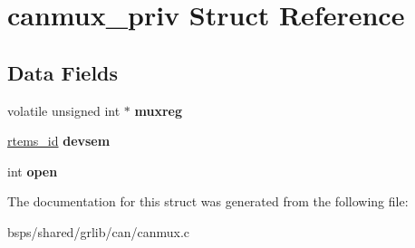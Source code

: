 \hypertarget{structcanmux__priv}{}\section{canmux\+\_\+priv Struct Reference}
\label{structcanmux__priv}
\subsection*{Data Fields}
\begin{DoxyCompactItemize}
\item 
\mbox{\label{structcanmux__priv_aa8e87192fa4ab4be10a4045beac86cce}} 
volatile unsigned int $\ast$ {\bfseries muxreg}
\item 
\mbox{\label{structcanmux__priv_ae428dd2e0b4c8d14272a85972748fe80}} 
\mbox{\hyperlink{group__ClassicTasks_gab20892b814dced7dd4e5b9bf42becd57}{rtems\+\_\+id}} {\bfseries devsem}
\item 
\mbox{\label{structcanmux__priv_aa5d22d97cb24eac09e49e99a39513dc7}} 
int {\bfseries open}
\end{DoxyCompactItemize}


The documentation for this struct was generated from the following file\+:\begin{DoxyCompactItemize}
\item 
bsps/shared/grlib/can/canmux.\+c\end{DoxyCompactItemize}
